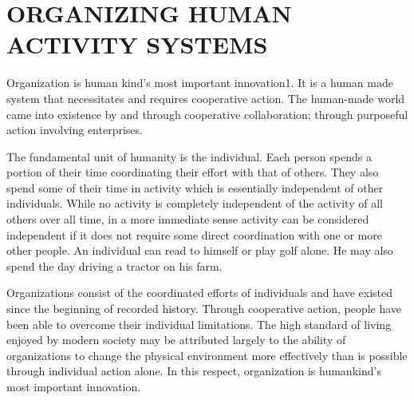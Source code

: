 \chapter{ORGANIZING HUMAN ACTIVITY SYSTEMS}\label{chap:03}

Organization is human kind’s most important innovation1. It is a human made system that necessitates and requires cooperative action. The human-made world came into existence by and through cooperative collaboration; through purposeful action involving enterprises.

The fundamental unit of humanity is the individual. Each person spends a portion of their time coordinating their effort with that of others. They also spend some of their time in activity which is essentially independent of other individuals. While no activity is completely independent of the activity of all others over all time, in a more immediate sense activity can be considered independent if it does not require some direct coordination with one or more other people. An individual can read to himself or play golf alone. He may also spend the day driving a tractor on his farm.

Organizations consist of the coordinated efforts of individuals and have existed since the beginning of recorded history. Through cooperative action, people have been able to overcome their individual limitations. The high standard of living enjoyed by modern society may be attributed largely to the ability of organizations to change the physical environment more effectively than is possible through individual action alone. In this respect, organization is humankind’s most important innovation.








